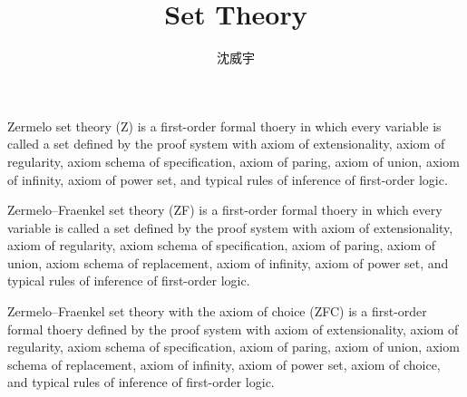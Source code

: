 \documentclass[a4paper,12pt]{article}
\begin{document}
\title{Set Theory}
\author{沈威宇}
\date{\temtoday}
\titletocdoc
{}
Zermelo set theory (Z) is a first-order formal thoery in which every variable is called a set defined by the proof system with axiom of extensionality, axiom of regularity, axiom schema of specification, axiom of paring, axiom of union, axiom of infinity, axiom of power set, and typical rules of inference of first-order logic.

Zermelo–Fraenkel set theory (ZF) is a first-order formal thoery in which every variable is called a set defined by the proof system with axiom of extensionality, axiom of regularity, axiom schema of specification, axiom of paring, axiom of union, axiom schema of replacement, axiom of infinity, axiom of power set, and typical rules of inference of first-order logic.

Zermelo–Fraenkel set theory with the axiom of choice (ZFC) is a first-order formal thoery defined by the proof system with axiom of extensionality, axiom of regularity, axiom schema of specification, axiom of paring, axiom of union, axiom schema of replacement, axiom of infinity, axiom of power set, axiom of choice, and typical rules of inference of first-order logic.
\end{document}
